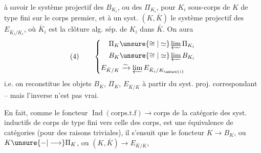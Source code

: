 à savoir le système projectif des $B_{K_i}$, ou des $\Pi_{K_i}$, pour $K_i$ sous-corps de $K$ de type fini sur le corps premier, et à un syst. $(K,\bar K)$ le système projectif des $E_{\bar K_i/K_i}$, où $\bar K_i$ est la clôture alg. sép. de $K_i$ dans $\bar K$. On aura
\[
(4)\qquad\left\{\begin{aligned}
\Pi_K&\unsure{\cong|\simeq}\varprojlim\Pi_{K_i}\\
B_K&\unsure{\cong|\simeq}\varprojlim B_{K_i}\\
E_{\bar K/K}&\xrightarrow{\sim}\varprojlim E_{\bar K_i/K_{\unsure{i}}}
\end{aligned}\right.
\]
i.e. on reconstitue les objets $B_K$, $\Pi_K$, $E_{\bar K/K}$ à partir du syst. proj. correspondant -- mais l'inverse n'est pas vrai.

En fait, comme le foncteur $\operatorname{Ind}(\text{corps.t.f})\longrightarrow\text{corps}$ de la catégorie des syst. inductifs de corps de type fini vers celle des corps, est une équivalence de catégories (pour des raisons triviales), il s'ensuit que le foncteur $K\longrightarrow B_K$, ou $K\unsure{-|\longrightarrow}\Pi_K$, ou $(K,\bar K)\longrightarrow E_{\bar K/K}$, 
